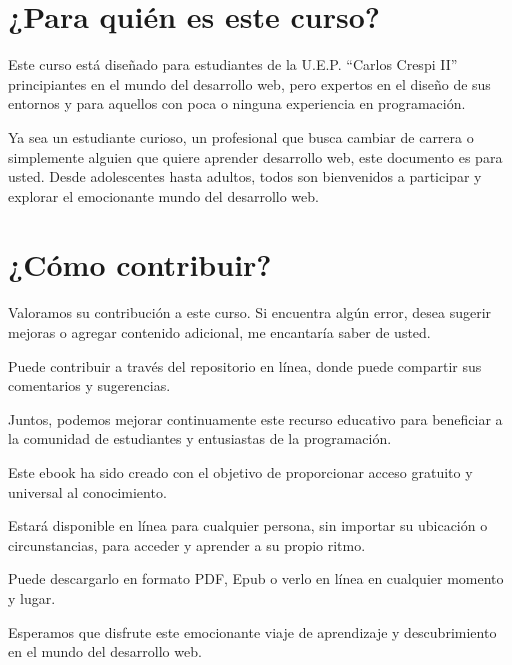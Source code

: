 \documentclass[
  letterpaper,
  DIV=11,
  numbers=noendperiod]{scrreprt}
\begin{document}
\section*{\texorpdfstring{\textbf{¿Para quién es este
curso?}}{¿Para quién es este curso?}}\label{para-quiuxe9n-es-este-curso}


Este curso está diseñado para estudiantes de la U.E.P. ``Carlos Crespi
II'' principiantes en el mundo del desarrollo web, pero expertos en el
diseño de sus entornos y para aquellos con poca o ninguna experiencia en
programación.

Ya sea un estudiante curioso, un profesional que busca cambiar de
carrera o simplemente alguien que quiere aprender desarrollo web, este
documento es para usted. Desde adolescentes hasta adultos, todos son
bienvenidos a participar y explorar el emocionante mundo del desarrollo
web.

\section*{\texorpdfstring{\textbf{¿Cómo
contribuir?}}{¿Cómo contribuir?}}\label{cuxf3mo-contribuir}


Valoramos su contribución a este curso. Si encuentra algún error, desea
sugerir mejoras o agregar contenido adicional, me encantaría saber de
usted.

Puede contribuir a través del repositorio en línea, donde puede
compartir sus comentarios y sugerencias.

Juntos, podemos mejorar continuamente este recurso educativo para
beneficiar a la comunidad de estudiantes y entusiastas de la
programación.

Este ebook ha sido creado con el objetivo de proporcionar acceso
gratuito y universal al conocimiento.

Estará disponible en línea para cualquier persona, sin importar su
ubicación o circunstancias, para acceder y aprender a su propio ritmo.

Puede descargarlo en formato PDF, Epub o verlo en línea en cualquier
momento y lugar.

Esperamos que disfrute este emocionante viaje de aprendizaje y
descubrimiento en el mundo del desarrollo web.
\end{document}
